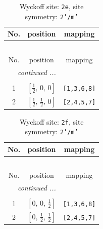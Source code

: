 \documentclass[fleqn,8pt]{jsarticle}
\begin{document}
\begin{longtable}{ccc}
\caption{Wyckoff site: {\tt 2e}, site symmetry: {\tt 2'/m'}}
 \\
 \hline \hline
No. & position & mapping \\ \hline \endfirsthead

\multicolumn{2}{l}{\tablename\ \thetable{}} \\
 \hline \hline
No. & position & mapping \\ \hline \endhead

 \hline \hline
\multicolumn{2}{r}{\footnotesize\it continued ...} \\ \endfoot

 \hline \hline
\multicolumn{2}{r}{} \\ \endlastfoot

1 & $\left[ \frac{1}{2},\, 0,\, 0 \right]$ & {\tt [1,3,6,8]} \\ \hline
2 & $\left[ \frac{1}{2},\, \frac{1}{2},\, 0 \right]$ & {\tt [2,4,5,7]} \\
\end{longtable}
\renewcommand{\arraystretch}{1.2}
\begin{longtable}{ccc}
\caption{Wyckoff site: {\tt 2f}, site symmetry: {\tt 2'/m'}}
 \\
 \hline \hline
No. & position & mapping \\ \hline \endfirsthead

\multicolumn{2}{l}{\tablename\ \thetable{}} \\
 \hline \hline
No. & position & mapping \\ \hline \endhead

 \hline \hline
\multicolumn{2}{r}{\footnotesize\it continued ...} \\ \endfoot

 \hline \hline
\multicolumn{2}{r}{} \\ \endlastfoot

1 & $\left[ 0,\, 0,\, \frac{1}{2} \right]$ & {\tt [1,3,6,8]} \\ \hline
2 & $\left[ 0,\, \frac{1}{2},\, \frac{1}{2} \right]$ & {\tt [2,4,5,7]} \\
\end{longtable}
\renewcommand{\arraystretch}{1.2}
\end{document}
